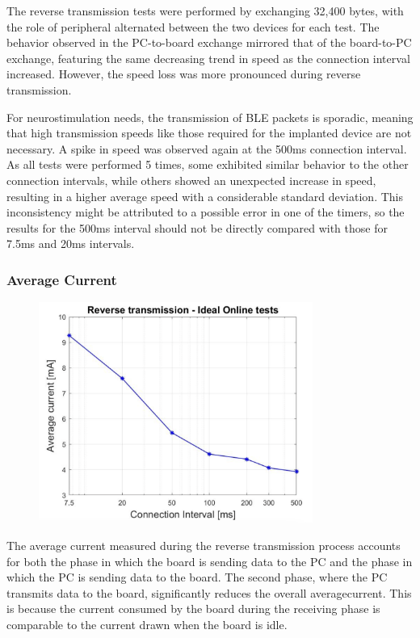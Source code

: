 \documentclass{Configuration_Files/PoliMi3i_thesis}
\begin{document}
The reverse transmission tests were performed by exchanging 32,400 bytes, with the role of peripheral alternated between the two devices for each test. The behavior observed in the PC-to-board exchange mirrored that of the board-to-PC exchange, featuring the same decreasing trend in speed as the connection interval increased. However, the speed loss was more pronounced during reverse transmission.

For neurostimulation needs, the transmission of BLE packets is sporadic, meaning that high transmission speeds like those required for the implanted device are not necessary. A spike in speed was observed again at the 500ms connection interval. As all tests were performed 5 times, some exhibited similar behavior to the other connection intervals, while others showed an unexpected increase in speed, resulting in a higher average speed with a considerable standard deviation. This inconsistency might be attributed to a possible error in one of the timers, so the results for the 500ms interval should not be directly compared with those for 7.5ms and 20ms intervals.

\subsubsection*{Average Current}

\begin{figure}[h!]
    \centering
    \includegraphics[width=0.8\textwidth]{Results Manuel/figure40}
    \label{fig:figure1}
\end{figure}

The average current measured during the reverse transmission process accounts for both the phase in which the board is sending data to the PC and the phase in which the PC is sending data to the board. The second phase, where the PC transmits data to the board, significantly reduces the overall averagecurrent. This is because the current consumed by the board during the receiving phase is comparable to the current drawn when the board is idle.
\end{document}
